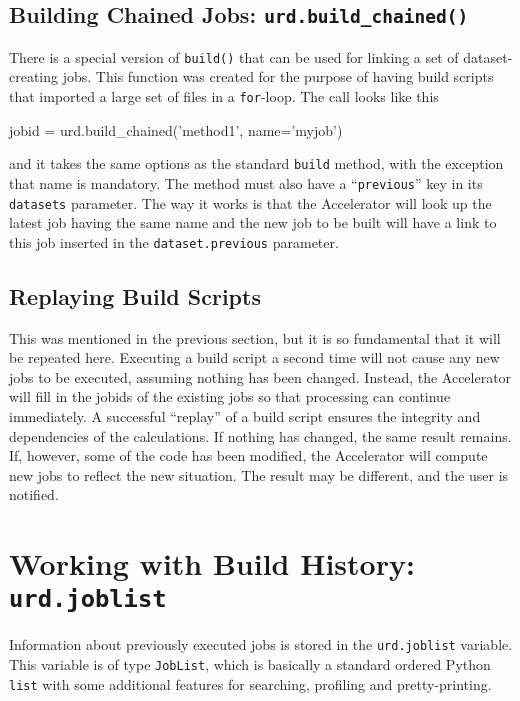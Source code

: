 \subsection{Building Chained Jobs: \texttt{urd.build\_chained()}}
There is a special version of \texttt{build()} that can be used for
linking a set of dataset-creating jobs.  This function was created for
the purpose of having build scripts that imported a large set of files
in a \texttt{for}-loop.  The call looks like this
\begin{python}
jobid = urd.build_chained('method1', name='myjob')
\end{python}
and it takes the same options as the standard \texttt{build} method,
with the exception that name is mandatory.  The method must also have
a ``\texttt{previous}'' key in its \texttt{datasets} parameter.  The
way it works is that the Accelerator will look up the latest job
having the same name and the new job to be built will have a link to
this job inserted in the \texttt{dataset.previous} parameter.



\subsection{Replaying Build Scripts}
This was mentioned in the previous section, but it is so fundamental
that it will be repeated here.  Executing a build script a second time
will not cause any new jobs to be executed, assuming nothing has been
changed.  Instead, the Accelerator will fill in the jobids of the
existing jobs so that processing can continue immediately.  A
successful ``replay'' of a build script ensures the integrity and
dependencies of the calculations.  If nothing has changed, the same
result remains.  If, however, some of the code has been modified, the
Accelerator will compute new jobs to reflect the new situation.  The
result may be different, and the user is notified.




\section{Working with Build History:  \texttt{urd.joblist}}
\label{sec:joblist}

Information about previously executed jobs is stored in
the \texttt{urd.joblist} variable.  This variable is of
type \texttt{JobList}, which is basically a standard ordered
Python \texttt{list} with some additional features for searching,
profiling and pretty-printing.


